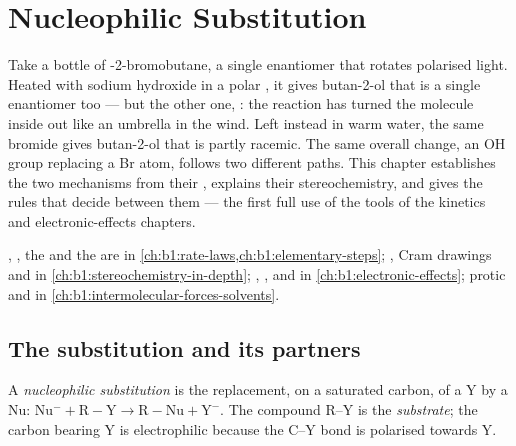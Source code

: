 \chapter{Nucleophilic Substitution}\label{ch:b1:nucleophilic-substitution}

Take a bottle of -2-bromobutane, a single enantiomer that rotates
polarised light. Heated with sodium hydroxide in a polar ,
it gives butan-2-ol that is a single enantiomer too --- but the other
one, : the reaction has turned the molecule inside out like an
umbrella in the wind. Left instead in warm water, the same bromide gives
butan-2-ol that is partly racemic. The same overall change, an OH group
replacing a Br atom, follows two different paths. This chapter
establishes the two mechanisms from their , explains their
stereochemistry, and gives the rules that decide between them --- the
first full use of the tools of the kinetics and electronic-effects
chapters.

\begin{recall}
, , the  and the
 are in \cref{ch:b1:rate-laws,ch:b1:elementary-steps};
, Cram drawings and  in
\cref{ch:b1:stereochemistry-in-depth}; , ,
 and  in \cref{ch:b1:electronic-effects};
protic and  in \cref{ch:b1:intermolecular-forces-solvents}.
\end{recall}

\section{The substitution and its partners}

\begin{definition}\label{def:b1:nucleophilic-substitution:substitution}
A \emph{nucleophilic substitution} is
the replacement, on a saturated carbon, of a  Y by a
 Nu: $\mathrm{Nu^-} + \mathrm{R{-}Y} \to \mathrm{R{-}Nu} +
\mathrm{Y^-}$. The compound R--Y is the \emph{substrate};
the carbon bearing Y is electrophilic because the C--Y bond is polarised
towards Y.
\end{definition}

